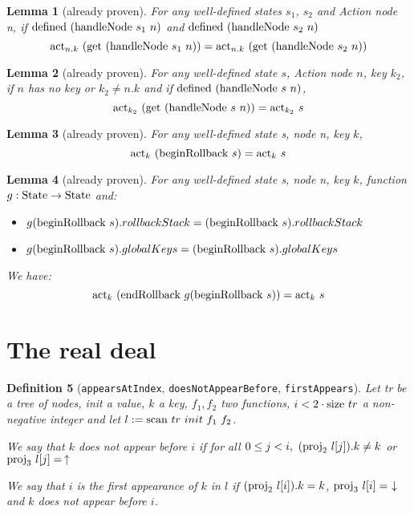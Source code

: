 \documentclass{article}
\newtheorem{lemma}{Lemma}
\newtheorem{definition}[lemma]{Definition}
\newcommand{\textfun}[1]{\textup{#1}}
\newcommand{\textcode}[1]{\texttt{#1}}
\newcommand{\longscan}[4]{\textfun{scan}\ #1\ #2\ #3 \ #4}
\newcommand{\up}{\uparrow}
\newcommand{\down}{\downarrow}
\newcommand{\hNode}[2]{\textfun{handleNode}\ #1\ #2}
\newcommand{\beginRb}[1]{\textfun{beginRollback}\ #1}
\newcommand{\enRb}[1]{\textfun{endRollback}\ #1}
\newcommand{\defined}[1]{\textfun{defined}\ #1}
\newcommand{\get}[1]{\textfun{get}\ #1}
\newcommand{\size}[1]{\textfun{size}\ #1}
\newcommand{\snd}[1]{\textfun{proj}_2\ #1}
\newcommand{\trd}[1]{\textfun{proj}_3\ #1}
\newcommand{\state}{\textfun{State}}
\newcommand{\actkey}[2]{\textfun{act}_{#1}\ #2}
\begin{document}
\begin{lemma}[already proven]
    \label{same_key_after_hnode}
    For any well-defined states $s_1$, $s_2$ and Action node n, if $\defined{(\hNode{s_ 1}{n})}$ and $\defined{(\hNode{s_ 2}{n})}$ 
    \[\actkey{n.k}{(\get{(\hNode{s_1}{n})})} = \actkey{n.k}{(\get{(\hNode{s_2}{n})})}\]
\end{lemma}


\begin{lemma}[already proven]
    \label{actkey_handle_node}
    For any well-defined state $s$, Action node $n$, key $k_2$, if $n$ has no key or $k_2 \neq n.k$ and if $\defined{(\hNode{s}{n})}$,
    \[\actkey{k_2}{(\get{(\hNode{s}{n})})} = \actkey{k_2}{s}\]
\end{lemma}

\begin{lemma}[already proven]
    \label{act_begin_rb}
    For any well-defined state s, node n, key $k$,
    \[\actkey{k}{(\beginRb{s})} = \actkey{k}{s}\]
\end{lemma}


\begin{lemma}[already proven]
    \label{skip_rb}
    For any well-defined state s, node n, key $k$, function $g: \state \rightarrow \state $ and:
    \begin{itemize}
        \item $g(\beginRb{s}).rollbackStack = (\beginRb{s}).rollbackStack$
        \item $g(\beginRb{s}).globalKeys = (\beginRb{s}).globalKeys$
    \end{itemize}

    We have:
    \[\actkey{k}{(\enRb{g(\beginRb{s})})} = \actkey{k}{s}\]
    
\end{lemma}






\newpage




\section*{The real deal}


\begin{definition}[\textcode{appearsAtIndex}, \textcode{doesNotAppearBefore}, \textcode{firstAppears}]
    \label{appear_def}
    Let tr be a tree of nodes, init a value, $k$ a key, $f_1, f_2$ two functions, $i < 2 \cdot \size{tr}$ a non-negative integer and let $l := \longscan{tr}{init}{f_1}{f_2}$. 

    We say that $k$ does not appear before $i$ if for all $0 \leq j < i,\  (\snd{l[j]}).k \neq k$ or $\trd{l[j]} =\, \up$

    We say that $i$ is the first appearance of $k$ in $l$ if $(\snd{l[i]}).k = k$, $\trd{l[i]} = \ \down$ and $k$ does not appear before $i$.
\end{definition}
\end{document}

